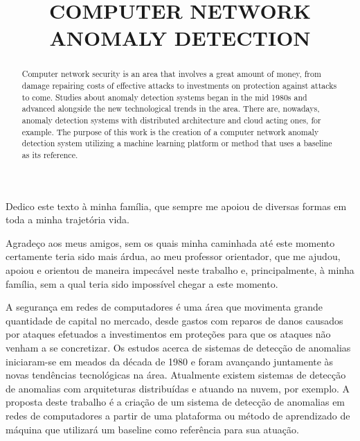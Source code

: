 \documentclass[openright]{normas-utf-tex} %
\title{\MakeUppercase{COMPUTER NETWORK ANOMALY DETECTION}} %
\begin{document}
\capa %
\folhaderosto %

\begin{dedicatoria}
Dedico este texto à minha família, que sempre me apoiou de diversas formas em toda a minha trajetória vida.
\end{dedicatoria}

\begin{agradecimentos}
Agradeço aos meus amigos, sem os quais minha caminhada até este momento certamente teria sido mais árdua, ao meu professor orientador, que me ajudou, apoiou e orientou de maneira impecável neste trabalho e, principalmente, à minha família, sem a qual teria sido impossível chegar a este momento.
\end{agradecimentos}



\begin{resumo}
A segurança em redes de computadores é uma área que movimenta grande quantidade de capital no mercado, desde gastos com reparos de danos causados por ataques efetuados a investimentos em proteções para que os ataques não venham a se concretizar. Os estudos acerca de sistemas de detecção de anomalias iniciaram-se em meados da década de 1980 e foram avançando juntamente às novas tendências tecnológicas na área. Atualmente existem sistemas de detecção de anomalias com arquiteturas distribuídas e atuando na nuvem, por exemplo. A proposta deste trabalho é a criação de um sistema de detecção de anomalias em redes de computadores a partir de uma plataforma ou método de aprendizado de máquina que utilizará um baseline como referência para sua atuação.
\end{resumo}

\begin{abstract}
Computer network security is an area that involves a great amount of money, from damage repairing costs of effective attacks to investments on protection against attacks to come. Studies about anomaly detection systems began in the mid 1980s and advanced alongside the new technological trends in the area. There are, nowadays, anomaly detection systems with distributed architecture and cloud acting ones, for example. The purpose of this work is the creation of a computer network anomaly detection system utilizing a machine learning platform or method that uses a baseline as its reference.
\end{abstract}
\end{document}
